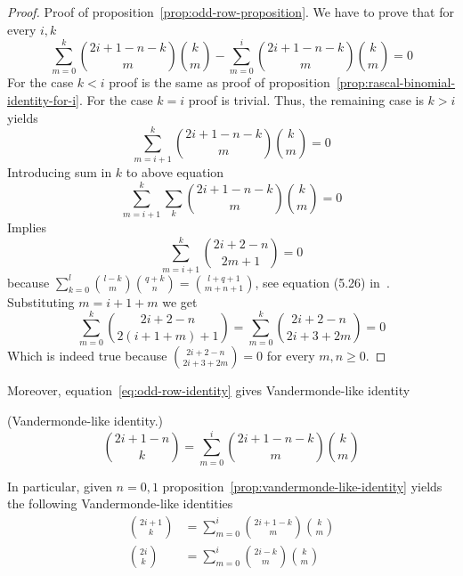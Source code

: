 \begin{proof}
    Proof of proposition~\eqref{prop:odd-row-proposition}.
    We have to prove that for every $i,k$
    \begin{equation*}
        \sum_{m=0}^{k} \binom{2i+1-n-k}{m} \binom{k}{m} - \sum_{m=0}^{i} \binom{2i+1-n-k}{m} \binom{k}{m} = 0
    \end{equation*}
    For the case $k<i$ proof is the same as proof of proposition~\eqref{prop:rascal-binomial-identity-for-i}.
    For the case $k=i$ proof is trivial.
    Thus, the remaining case is $k>i$ yields
    \begin{equation*}
        \sum_{m=i+1}^{k} \binom{2i+1-n-k}{m} \binom{k}{m} = 0
    \end{equation*}
    Introducing sum in $k$ to above equation
    \begin{equation*}
        \sum_{m=i+1}^{k} \sum_{k} \binom{2i+1-n-k}{m} \binom{k}{m} = 0
    \end{equation*}
    Implies
    \begin{equation*}
        \sum_{m=i+1}^{k} \binom{2i+2-n}{2m+1} = 0
    \end{equation*}
    because $\sum_{k=0}^{l} \binom{l-k}{m} \binom{q+k}{n} = \binom{l+q+1}{m+n+1}$, see equation (5.26) in~\cite{graham1994concrete}.
    Substituting $m=i+1+m$ we get
    \begin{equation*}
        \sum_{m=0}^{k} \binom{2i+2-n}{2(i+1+m)+1} = \sum_{m=0}^{k} \binom{2i+2-n}{2i+3+2m} = 0
    \end{equation*}
    Which is indeed true because $\binom{2i+2-n}{2i+3+2m}=0$ for every $m,n \geq 0$.
\end{proof}
Moreover, equation~\eqref{eq:odd-row-identity} gives Vandermonde-like identity
\begin{proposition} (Vandermonde-like identity.)
    \label{prop:vandermonde-like-identity}
    \begin{equation*}
        \binom{2i+1-n}{k} = \sum_{m=0}^{i} \binom{2i+1-n-k}{m} \binom{k}{m}
    \end{equation*}
\end{proposition}
In particular, given $n=0,1$ proposition~\eqref{prop:vandermonde-like-identity}
yields the following Vandermonde-like identities
\begin{align*}
    \binom{2i+1}{k} &= \sum_{m=0}^{i} \binom{2i+1-k}{m} \binom{k}{m} \\
    \binom{2i}{k}   &= \sum_{m=0}^{i} \binom{2i-k}{m} \binom{k}{m}
\end{align*}

